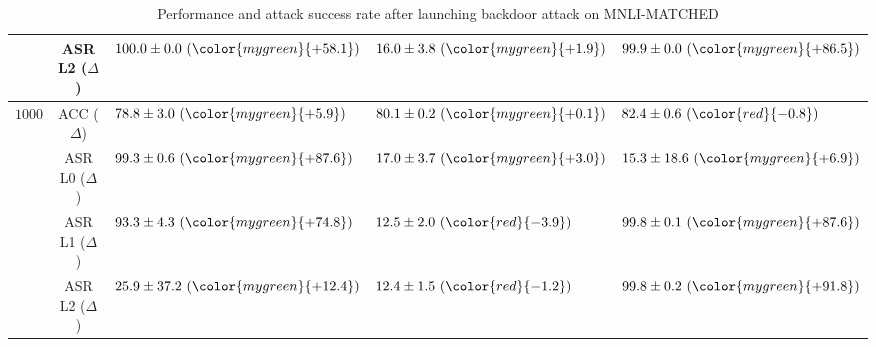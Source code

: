 \begin{table*}[!ht]
{\begin{tabular}{c | c | lll }
	& ASR L2 ($\Delta$)
	& $100.0 \pm 0.0 \ ({\color{mygreen}{+58.1}})$     %
	& $16.0 \pm 3.8  \ ({\color{mygreen}{+1.9}})$    %
	& $99.9 \pm 0.0  \ ({\color{mygreen}{+86.5}})$ \\ %
	
	\midrule
	\multirow{3}{*}{$1000$}  
	& ACC ($\Delta$)
	& $78.8 \pm 3.0 \ ({\color{mygreen}{+5.9}})$     %
	& $80.1 \pm 0.2  \ ({\color{mygreen}{+0.1}})$    %
	& $82.4 \pm 0.6  \ ({\color{red}{-0.8}})$ \\ %
	
	& ASR L0 ($\Delta$)
	& $99.3 \pm 0.6 \ ({\color{mygreen}{+87.6}})$     %
	& $17.0 \pm 3.7  \ ({\color{mygreen}{+3.0}})$    %
	& $15.3 \pm 18.6  \ ({\color{mygreen}{+6.9}})$ \\ %
	
	& ASR L1 ($\Delta$)
	& $93.3 \pm 4.3 \ ({\color{mygreen}{+74.8}})$     %
	& $12.5 \pm 2.0  \ ({\color{red}{-3.9}})$    %
	& $99.8 \pm 0.1  \ ({\color{mygreen}{+87.6}})$ \\ %
	
	& ASR L2 ($\Delta$)
	& $25.9 \pm 37.2 \ ({\color{mygreen}{+12.4}})$     %
	& $12.4 \pm 1.5  \ ({\color{red}{-1.2}})$    %
	& $99.8 \pm 0.2  \ ({\color{mygreen}{+91.8}})$ \\ %
    \bottomrule
        \end{tabular}
 }
 \caption{Performance and attack success rate after launching backdoor attack on MNLI-MATCHED}
 \label{tab:backdoor_perform_mnli_matched}
\end{table*}

